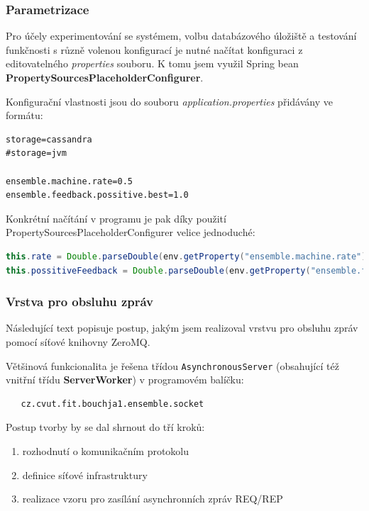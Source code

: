 \documentclass[thesis=M,czech]{FITthesis}[2014/05/07]
\begin{document}
\subsubsection{Parametrizace}
\label{param}
Pro účely experimentování se systémem, volbu databázového úložiště a testování funkčnosti s různě volenou konfigurací je nutné načítat konfiguraci z editovatelného \emph{properties} souboru. K tomu jsem využil Spring bean \textbf{PropertySourcesPlaceholderConfigurer}.

Konfigurační vlastnosti jsou do souboru \emph{application.properties} přidávány ve formátu:

\begin{lstlisting}
storage=cassandra
#storage=jvm
   
ensemble.machine.rate=0.5
ensemble.feedback.possitive.best=1.0
\end{lstlisting}

Konkrétní načítání v programu je pak díky použití PropertySourcesPlaceholderConfigurer velice jednoduché:

\begin{lstlisting}[language=java]
this.rate = Double.parseDouble(env.getProperty("ensemble.machine.rate"));
this.possitiveFeedback = Double.parseDouble(env.getProperty("ensemble.feedback.possitive.best"));
\end{lstlisting}

\subsubsection{Vrstva pro obsluhu zpráv}
\label{sub:messvrs}
Následující text popisuje postup, jakým jsem realizoval vrstvu pro obsluhu zpráv pomocí síťové knihovny ZeroMQ.

Většinová funkcionalita je řešena třídou \texttt{AsynchronousServer} (obsahující též vnitřní třídu \textbf{ServerWorker}) v programovém balíčku:

\begin{verbatim}
   cz.cvut.fit.bouchja1.ensemble.socket
\end{verbatim}

Postup tvorby by se dal shrnout do tří kroků:

\begin{enumerate}
	\item rozhodnutí o komunikačním protokolu
	\item definice síťové infrastruktury
	\item realizace vzoru pro zasílání asynchronních zpráv REQ/REP
\end{enumerate}
\end{document}
